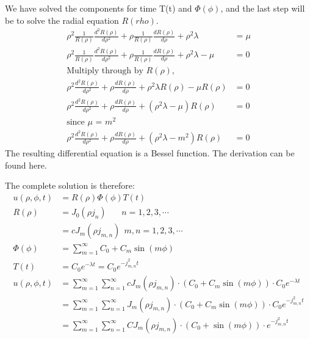 \documentclass[11pt]{article}
\begin{document}
We have solved the components for time T(t) and \(\Phi(\phi)\), and the
last step will be to solve the radial equation \(R(rho)\).
\begin{equation}
\begin{split}
\rho^2 \frac {1}{R(\rho)} \frac {d^2 R(\rho)}{d \rho^2} + \rho \frac{1}{R(\rho)} \frac{d R(\rho)}{d \rho}   + 
\rho^2 \lambda &= \mu \\
\rho^2 \frac {1}{R(\rho)} \frac {d^2 R(\rho)}{d \rho^2} + \rho \frac{1}{R(\rho)} \frac{d R(\rho)}{d \rho}   + 
\rho^2 \lambda - \mu &= 0 \\
\text{Multiply through by $R(\rho)$,} \\
\rho^2  \frac {d^2 R(\rho)}{d \rho^2} + \rho \frac{d R(\rho)}{d \rho} + \rho^2 \lambda R(\rho) - \mu R(\rho) &= 0 \\
\rho^2  \frac {d^2 R(\rho)}{d \rho^2} + \rho \frac{d R(\rho)}{d \rho} + (\rho^2 \lambda - \mu)R(\rho) &= 0 \\
\text{since $\mu$ = $m^2$} \\
\rho^2  \frac {d^2 R(\rho)}{d \rho^2} + \rho \frac{d R(\rho)}{d \rho} + (\rho^2 \lambda - m^2)R(\rho) &= 0
\end{split}
\end{equation} The resulting differential equation is a Bessel function.
The derivation can be found here.

The complete solution is therefore: \begin{equation}
\begin{split}
u(\rho, \phi, t) &= R(\rho) \Phi(\phi) T(t) \\
R(\rho) &= J_0(\rho j_{n}) \>\>\>\>\>\>\>\> n = 1, 2, 3, \cdots \\
&= c J_{m}(\rho j_{m,n})  \>\> m, n = 1, 2, 3, \cdots \\
\Phi(\phi) &= \sum_{m=1}^{\infty} C_0 + {C_m \sin(m \phi)} \\
T(t) &= C_{0} e ^ {- \lambda t} = C_{0} e ^ {- j_{m,n}^2 t}  \\
u(\rho, \phi, t) &= \sum_{m=1}^{\infty} \sum_{n=1}^{\infty} c J_{m}(\rho j_{m,n}) \cdot \left(C_0 + {C_m \sin(m \phi)} \right) \cdot  C_{0} e ^ {- \lambda t} \\
&= \sum_{m=1}^{\infty} \sum_{n=1}^{\infty} J_{m}(\rho j_{m,n}) \cdot \left(C_0 + {C_m \sin(m \phi)} \right) \cdot  C_{0} e ^ {- j_{m,n}^2 t} \\
&= \sum_{m=1}^{\infty} \sum_{n=1}^{\infty} C {J_{m}(\rho j_{m,n}) \cdot \left(C_0 + {\sin(m \phi)} \right) \cdot e ^ {- j_{m,n}^2 t} }
\end{split}
\end{equation}
\end{document}
